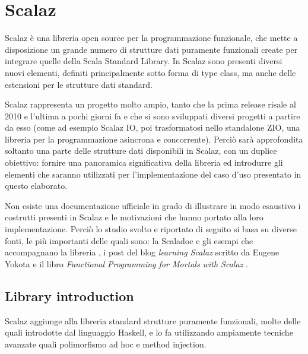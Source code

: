 \chapter{Scalaz} %

\label{Chapter1} %

Scalaz è una libreria open source per la programmazione funzionale, che mette a disposizione un grande numero di strutture dati puramente funzionali create per integrare quelle della Scala Standard Library. In Scalaz sono presenti diversi nuovi elementi, definiti principalmente sotto forma di type class, ma anche delle estensioni per le strutture dati standard.

Scalaz rappresenta un progetto molto ampio, tanto che la prima release risale al 2010 e l'ultima a pochi giorni fa e che si sono sviluppati diversi progetti a partire da esso (come ad esempio Scalaz IO, poi trasformatosi nello standalone ZIO, una libreria per la programmazione asincrona e concorrente). Perciò sarà approfondita soltanto una parte delle strutture dati disponibili in Scalaz, con un duplice obiettivo: fornire una panoramica significativa della libreria ed introdurre gli elementi che saranno utilizzati per l'implementazione del caso d'uso presentato in questo elaborato.

Non esiste una documentazione ufficiale in grado di illustrare in modo esaustivo i costrutti presenti in Scalaz e le motivazioni che hanno portato alla loro implementazione. Perciò lo studio svolto e riportato di seguito si basa su diverse fonti, le più importanti delle quali sono: la Scaladoc e gli esempi che accompagnano la libreria \cite{Scalaz}, i post del blog \textit{learning Scalaz} scritto da Eugene Yokota \cite{LearningScalaz} e il libro \textit{Functional Programming for Mortals with Scalaz} \cite{FpForMortalsWithScalaz}.


\section{Library introduction}

Scalaz aggiunge alla libreria standard strutture puramente funzionali, molte delle quali introdotte dal linguaggio Haskell, e lo fa utilizzando ampiamente tecniche avanzate quali polimorfismo ad hoc e method injection.

